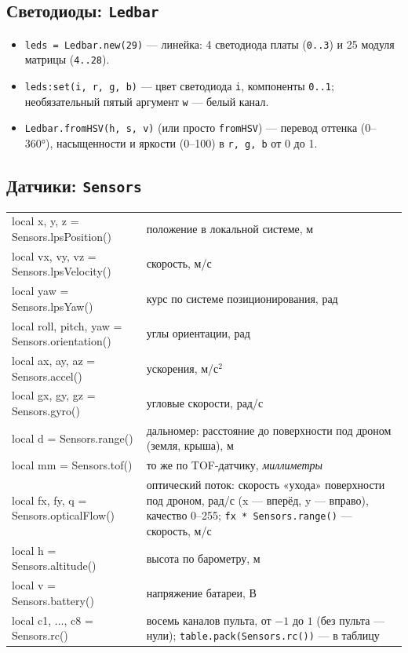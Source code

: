 \subsection{Светодиоды: \texttt{Ledbar}}
\begin{itemize}
  \item \verb|leds = Ledbar.new(29)| --- линейка: 4 светодиода платы (\verb|0..3|) и 25 модуля матрицы (\verb|4..28|).
  \item \verb|leds:set(i, r, g, b)| --- цвет светодиода \verb|i|, компоненты \verb|0..1|; необязательный пятый аргумент \verb|w| --- белый канал.
  \item \verb|Ledbar.fromHSV(h, s, v)| (или просто \verb|fromHSV|) --- перевод оттенка (0--360°), насыщенности и яркости (0--100) в \verb|r, g, b| от 0 до 1.
\end{itemize}

\subsection{Датчики: \texttt{Sensors}}
\begin{center}\small
\begin{tabularx}{\linewidth}{@{}>{\ttfamily}l X@{}}
\toprule
local x, y, z = Sensors.lpsPosition() & положение в локальной системе, м \\
local vx, vy, vz = Sensors.lpsVelocity() & скорость, м/с \\
local yaw = Sensors.lpsYaw() & курс по системе позиционирования, рад \\
local roll, pitch, yaw = Sensors.orientation() & углы ориентации, рад \\
local ax, ay, az = Sensors.accel() & ускорения, м/с$^2$ \\
local gx, gy, gz = Sensors.gyro() & угловые скорости, рад/с \\
local d = Sensors.range() & дальномер: расстояние до поверхности под дроном (земля, крыша), м \\
local mm = Sensors.tof() & то же по TOF-датчику, \emph{миллиметры} \\
local fx, fy, q = Sensors.opticalFlow() & оптический поток: скорость «ухода» поверхности под дроном, рад/с (x --- вперёд, y --- вправо), качество 0--255; \texttt{fx * Sensors.range()} --- скорость, м/с \\
local h = Sensors.altitude() & высота по барометру, м \\
local v = Sensors.battery() & напряжение батареи, В \\
local c1, ..., c8 = Sensors.rc() & восемь каналов пульта, от $-1$ до $1$ (без пульта --- нули); \texttt{table.pack(Sensors.rc())} --- в таблицу \\
\bottomrule
\end{tabularx}
\end{center}

